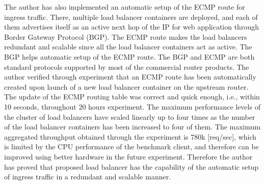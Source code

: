 
The author has also implemented an automatic setup of the ECMP route for ingress traffic.
There, multiple load balancer containers are deployed, and each of them advertises itself as an active next hop of the IP for web application through Border Gateway Protocol (BGP).
The ECMP route makes the load balancers redundant and scalable since all the load balancer containers act as active.
%
The BGP helps automatic setup of the ECMP route.  
The BGP and ECMP are both standard protocols supported by most of the commercial router products.
%
The author verified through experiment that an ECMP route has been automatically created upon launch of a new load balancer container on the upstream router.
The update of the ECMP routing table was correct and quick enough, i.e., within 10 seconds, throughout 20 hours experiment.
The maximum performance levels of the cluster of load balancers have scaled linearly up to four times as the number of the load balancer containers has been increased to four of them.
The maximum aggregated throughput obtained through the experiment is 780k [req/sec], which is limited by the CPU performance of the benchmark client, and therefore can be improved using better hardware in the future experiment.
Therefore the author has proved that proposed load balancer has the capability of the automatic setup of ingress traffic in a redundant and scalable manner.
%

